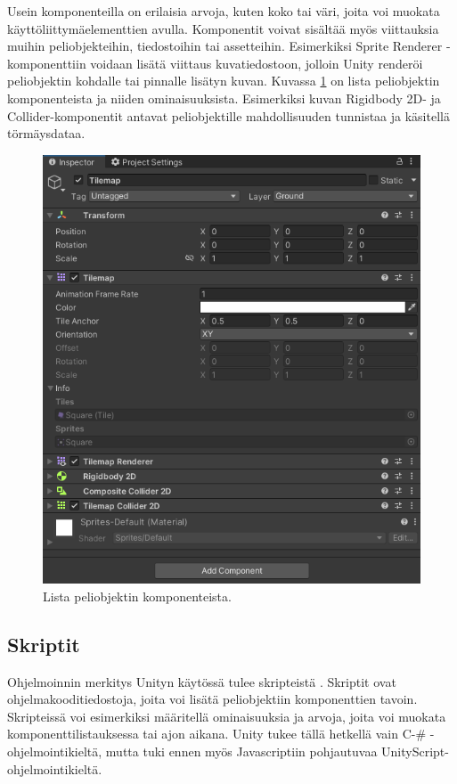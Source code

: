 \documentclass[utf8]{gradu3}
\begin{document}
Usein komponenteilla on erilaisia arvoja, kuten koko tai väri, joita voi muokata käyttöliittymäelementtien avulla. Komponentit voivat sisältää myös viittauksia muihin peliobjekteihin, tiedostoihin tai assetteihin. Esimerkiksi Sprite Renderer -komponenttiin voidaan lisätä viittaus kuvatiedostoon, jolloin Unity renderöi peliobjektin kohdalle tai pinnalle lisätyn kuvan. Kuvassa \ref{komponenttikuva} on lista peliobjektin komponenteista ja niiden ominaisuuksista. Esimerkiksi kuvan Rigidbody 2D- ja Collider-komponentit antavat peliobjektille mahdollisuuden tunnistaa ja käsitellä törmäysdataa.

\begin{figure}[t]
\centering
\includegraphics[width=12cm]{komponenttilistaus.png}
\caption{Lista peliobjektin komponenteista.}
\label{komponenttikuva}
\end{figure}

\subsection{Skriptit}

Ohjelmoinnin merkitys Unityn käytössä tulee skripteistä \parencite{unitydocscripts}. Skriptit ovat ohjelmakooditiedostoja, joita voi lisätä peliobjektiin komponenttien tavoin. Skripteissä voi esimerkiksi määritellä ominaisuuksia ja arvoja, joita voi muokata komponenttilistauksessa tai ajon aikana. Unity tukee tällä hetkellä vain C-\# -ohjelmointikieltä, mutta tuki ennen myös Javascriptiin pohjautuvaa UnityScript-ohjelmointikieltä.
\end{document}
